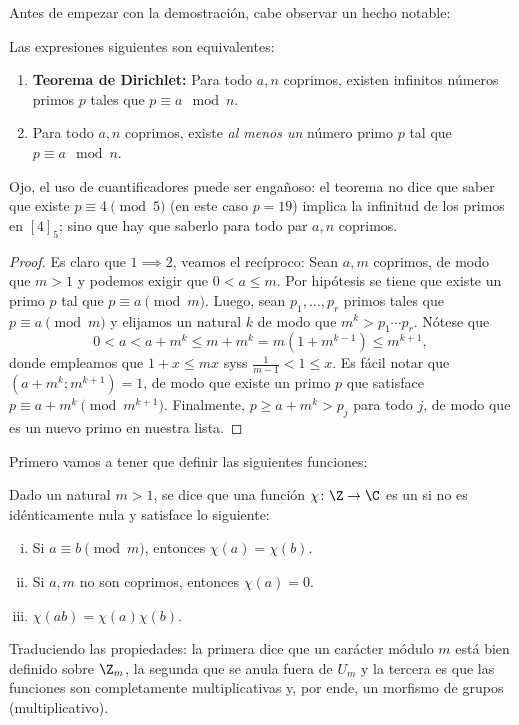 \documentclass[teoria-numeros.tex]{subfiles}
\begin{document}
Antes de empezar con la demostración, cabe observar un hecho notable:
\begin{thm}
	Las expresiones siguientes son equivalentes:
	\begin{enumerate}
		\item \textbf{Teorema de Dirichlet:} Para todo $a, n$ coprimos, existen infinitos números primos $p$ tales que $p \equiv a \mod n$.
		\item Para todo $a, n$ coprimos, existe \textit{al menos un} número primo $p$ tal que $p \equiv a \mod n$.
	\end{enumerate}
\end{thm}
Ojo, el uso de cuantificadores puede ser engañoso: el teorema no dice que saber que existe $p \equiv 4 \pmod 5$ (en este caso $p = 19$) implica la infinitud
de los primos en $[4]_5$; sino que hay que saberlo para todo par $a, n$ coprimos.
\begin{proof}
	Es claro que $1 \implies 2$, veamos el recíproco:
	Sean $a, m$ coprimos, de modo que $m > 1$ y podemos exigir que $0 < a \le m$.
	Por hipótesis se tiene que existe un primo $p$ tal que $p \equiv a \pmod m$.
	Luego, sean $p_1, \dots, p_r$ primos tales que $p \equiv a \pmod m$ y elijamos un natural $k$ de modo que $m^k > p_1\cdots p_r$.
	Nótese que
	$$ 0 < a < a + m^k \le m + m^k = m(1 + m^{k-1}) \le m^{k+1}, $$
	donde empleamos que $1 + x \le m x$ syss $ \frac{1}{m-1} < 1 \le x $.
	Es fácil notar que $(a + m^k; m^{k+1}) = 1$, de modo que existe un primo $p$ que satisface $p \equiv a + m^k \pmod{m^{k+1}}$.
	Finalmente, $p \ge a + m^k > p_j$ para todo $j$, de modo que es un nuevo primo en nuestra lista.
\end{proof}

Primero vamos a tener que definir las siguientes funciones:
\begin{mydefi}
	Dado un natural $m > 1$, se dice que una función $\chi\colon \Z \to \C$ es un  si no es idénticamente nula y
	satisface lo siguiente:
	\begin{enumerate}[i)]
		\item Si $a\equiv b\pmod m$, entonces $\chi(a) = \chi(b)$.
		\item Si $a, m$ no son coprimos, entonces $\chi(a) = 0$.
		\item $\chi(ab) = \chi(a)\chi(b)$.
	\end{enumerate}
\end{mydefi}
Traduciendo las propiedades: la primera dice que un carácter módulo $m$ está bien definido sobre $\Z_m$,
la segunda que se anula fuera de $U_m$ y la tercera es que las funciones son completamente multiplicativas y, por ende, un morfismo de grupos (multiplicativo).
\end{document}
